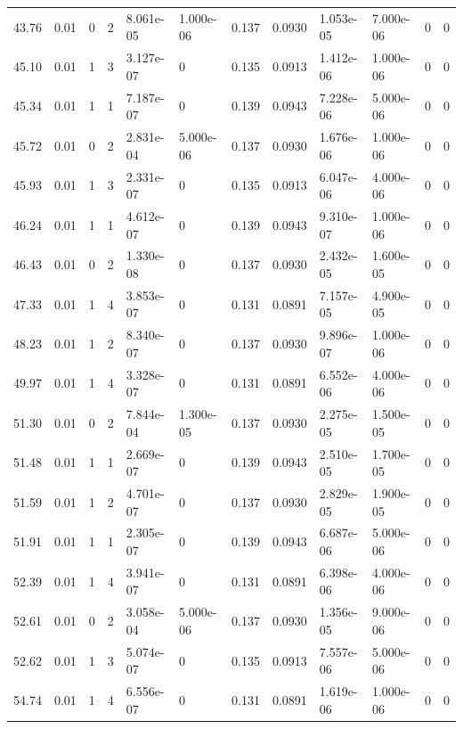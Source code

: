\documentclass[preview]{standalone}
\begin{document}
{{{\begin{tabular}{L{1.2cm}C{1.2cm} C{0.3cm}C{0.5cm} C{1.4cm}C{1.4cm} C{1.4cm}C{1.4cm} C{1.6cm}C{1.6cm} C{1.6cm}C{1.6cm}}
  43.76  &  0.01  & 0     &  2 &  8.061e-05  & 1.000e-06  &  0.137&   0.0930& 1.053e-05 & 7.000e-06   &  0 & 0  \\ 
  45.10  &  0.01  & 1     &  3 &  3.127e-07  & 0  &  0.135&   0.0913& 1.412e-06 & 1.000e-06   &  0 & 0  \\ 
  45.34  &  0.01  & 1     &  1 &  7.187e-07  & 0  &  0.139&   0.0943& 7.228e-06 & 5.000e-06   &  0 & 0  \\ 
  45.72  &  0.01  & 0     &  2 &  2.831e-04  & 5.000e-06  &  0.137&   0.0930& 1.676e-06 & 1.000e-06   &  0 & 0  \\ 
  45.93  &  0.01  & 1     &  3 &  2.331e-07  & 0  &  0.135&   0.0913& 6.047e-06 & 4.000e-06   &  0 & 0  \\ 
  46.24  &  0.01  & 1     &  1 &  4.612e-07  & 0  &  0.139&   0.0943& 9.310e-07 & 1.000e-06   &  0 & 0  \\ 
  46.43  &  0.01  & 0     &  2 &  1.330e-08  & 0  &  0.137&   0.0930& 2.432e-05 & 1.600e-05   &  0 & 0  \\ 
  47.33  &  0.01  & 1     &  4 &  3.853e-07  & 0  &  0.131&   0.0891& 7.157e-05 & 4.900e-05   &  0 & 0  \\ 
  48.23  &  0.01  & 1     &  2 &  8.340e-07  & 0  &  0.137&   0.0930& 9.896e-07 & 1.000e-06   &  0 & 0  \\ 
  49.97  &  0.01  & 1     &  4 &  3.328e-07  & 0  &  0.131&   0.0891& 6.552e-06 & 4.000e-06   &  0 & 0  \\ 
  51.30  &  0.01  & 0     &  2 &  7.844e-04  & 1.300e-05  &  0.137&   0.0930& 2.275e-05 & 1.500e-05   &  0 & 0  \\ 
  51.48  &  0.01  & 1     &  1 &  2.669e-07  & 0  &  0.139&   0.0943& 2.510e-05 & 1.700e-05   &  0 & 0  \\ 
  51.59  &  0.01  & 1     &  2 &  4.701e-07  & 0  &  0.137&   0.0930& 2.829e-05 & 1.900e-05   &  0 & 0  \\ 
  51.91  &  0.01  & 1     &  1 &  2.305e-07  & 0  &  0.139&   0.0943& 6.687e-06 & 5.000e-06   &  0 & 0  \\ 
  52.39  &  0.01  & 1     &  4 &  3.941e-07  & 0  &  0.131&   0.0891& 6.398e-06 & 4.000e-06   &  0 & 0  \\ 
  52.61  &  0.01  & 0     &  2 &  3.058e-04  & 5.000e-06  &  0.137&   0.0930& 1.356e-05 & 9.000e-06   &  0 & 0  \\ 
  52.62  &  0.01  & 1     &  3 &  5.074e-07  & 0  &  0.135&   0.0913& 7.557e-06 & 5.000e-06   &  0 & 0  \\ 
  54.74  &  0.01  & 1     &  4 &  6.556e-07  & 0  &  0.131&   0.0891& 1.619e-06 & 1.000e-06   &  0 & 0  \\ 

\end{tabular}}}}
\end{document}
